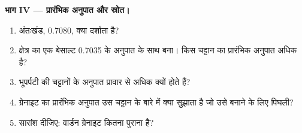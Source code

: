 \begin{problem}[{सप्ताहांत समस्या --- वार्डन ग्रेनाइट का काल-निर्धारण}]
\medskip
\noindent\textbf{भाग IV --- प्रारंभिक अनुपात और स्रोत।}
\begin{enumerate}[resume]
  \item अंतःखंड, 0.7080, क्या दर्शाता है?
  \item क्षेत्र का एक बेसाल्ट 0.7035 के अनुपात के साथ बना। किस चट्टान का
        प्रारंभिक अनुपात अधिक है?
  \item भूपर्पटी की चट्टानों के अनुपात प्रावार से अधिक क्यों होते हैं?
  \item ग्रेनाइट का प्रारंभिक अनुपात उस चट्टान के बारे में क्या सुझाता है जो
        उसे बनाने के लिए पिघली?
  \item सारांश दीजिए: वार्डन ग्रेनाइट कितना पुराना है?
\end{enumerate}
\end{problem}
